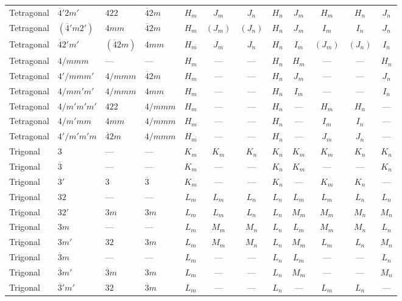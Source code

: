 \documentclass[a4paper,11pt]{article}
\newcommand{\ob}[1]{\overline{#1}}
\begin{document}
\begin{landscape}
\begin{longtable}{l l l l *{4}{c} *{4}{c}}
Tetragonal & $\ob{4}'2m'$ & $422$ & $\ob{4}2m$ & $H_m$ & $J_m$ & $J_n$ & $H_n$ & $J_m$ & $H_m$ & $H_n$ & $J_n$ \\
Tetragonal & $(\ob{4}'m2')$ & $4mm$ & $\ob{4}2m$ & $H_m$ & $(J_m)$ & $(J_n)$ & $H_n$ & $J_m$ & $I_m$ & $I_n$ & $J_n$ \\
Tetragonal & $\ob{4}2'm'$ & $(\ob{4}2m)$ & $4mm$ & $H_m$ & $J_m$ & $J_n$ & $H_n$ & $I_m$ & $(J_m)$ & $(J_n)$ & $I_n$ \\
Tetragonal & $4/mmm$ & --- & --- & $H_m$ & --- & --- & $H_n$ & $H_m$ & --- & --- & $H_n$ \\
Tetragonal & $4'/mmm'$ & $4/mmm$ & $\ob{4}2m$ & $H_m$ & --- & --- & $H_n$ & $J_m$ & --- & --- & $J_n$ \\
Tetragonal & $4/mm'm'$ & $4/mmm$ & $4mm$ & $H_m$ & --- & --- & $H_n$ & $I_m$ & --- & --- & $I_n$ \\
Tetragonal & $4/m'm'm'$ & $422$ & $4/mmm$ & $H_m$ & --- & --- & $H_n$ & --- & $H_m$ & $H_n$ & --- \\
Tetragonal & $4/m'mm$ & $4mm$ & $4/mmm$ & $H_m$ & --- & --- & $H_n$ & --- & $I_m$ & $I_n$ & --- \\
Tetragonal & $4'/m'm'm$ & $\ob{4}2m$ & $4/mmm$ & $H_m$ & --- & --- & $H_n$ & --- & $J_m$ & $J_n$ & --- \\
\addlinespace
Trigonal & $3$ & --- & --- & $K_m$ & $K_m$ & $K_n$ & $K_n$ & $K_m$ & $K_m$ & $K_n$ & $K_n$ \\
Trigonal & $\ob{3}$ & --- & --- & $K_m$ & --- & --- & $K_n$ & $K_m$ & --- & --- & $K_n$ \\
Trigonal & $\ob{3}'$ & $3$ & $\ob{3}$ & $K_m$ & --- & --- & $K_n$ & --- & $K_m$ & $K_n$ & --- \\
Trigonal & $32$ & --- & --- & $L_m$ & $L_m$ & $L_n$ & $L_n$ & $L_m$ & $L_m$ & $L_n$ & $L_n$ \\
Trigonal & $32'$ & $3m$ & $3m$ & $L_m$ & $L_m$ & $L_n$ & $L_n$ & $M_m$ & $M_m$ & $M_n$ & $M_n$ \\
Trigonal & $3m$ & --- & --- & $L_m$ & $M_m$ & $M_n$ & $L_n$ & $L_m$ & $M_m$ & $M_n$ & $L_n$ \\
Trigonal & $3m'$ & $32$ & $3m$ & $L_m$ & $M_m$ & $M_n$ & $L_n$ & $M_m$ & $L_m$ & $L_n$ & $M_n$ \\
Trigonal & $\ob{3}m$ & --- & --- & $L_m$ & --- & --- & $L_n$ & $L_m$ & --- & --- & $L_n$ \\
Trigonal & $\ob{3}m'$ & $\ob{3}m$ & $3m$ & $L_m$ & --- & --- & $L_n$ & $M_m$ & --- & --- & $M_n$ \\
Trigonal & $\ob{3}'m'$ & $32$ & $\ob{3}m$ & $L_m$ & --- & --- & $L_n$ & --- & $L_m$ & $L_n$ & --- \\

\end{longtable}
\end{landscape}
\end{document}
